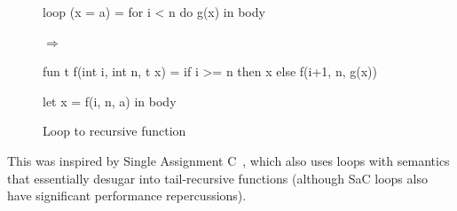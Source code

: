 \documentclass{sigplanconf}  %
\begin{document}
\begin{figure}
\begin{minipage}{0.35\columnwidth}
\begin{colorcode}
loop (x = a) =
  for i < n do
    g(x)
in body
\end{colorcode}
\end{minipage}
\begin{minipage}{0.05\columnwidth}
$\Rightarrow$
\end{minipage}
\begin{minipage}{0.6\columnwidth}
\begin{colorcode}
fun t f(int i, int n, t x) =
  if i >= n then x
     else f(i+1, n, g(x))

let x = f(i, n, a)
in body
\end{colorcode}
\end{minipage}
\caption{Loop to recursive function}
\label{fig:loop-recursion}
\end{figure}

This was inspired by Single Assignment C~\cite{grelck2006sac}, which
also uses loops with semantics that essentially desugar into
tail-recursive functions (although SaC loops also have significant
performance repercussions).
\end{document}

